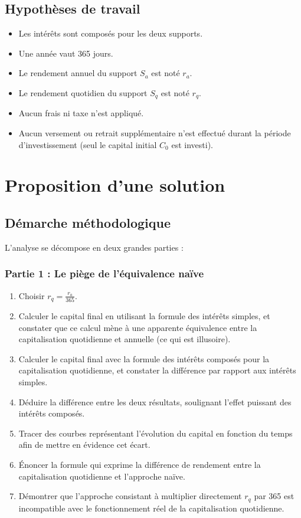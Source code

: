 \documentclass{article}
\begin{document}
\subsection{Hypothèses de travail}
\begin{itemize}
\item Les intérêts sont composés pour les deux supports.
\item Une année vaut 365 jours.
\item Le rendement annuel du support $S_a$ est noté $r_a$.
\item Le rendement quotidien du support $S_q$ est noté $r_q$.
\item Aucun frais ni taxe n'est appliqué.
\item Aucun versement ou retrait supplémentaire n’est effectué durant la période d'investissement (seul le capital initial $C_0$ est investi).
\end{itemize}

\section{Proposition d'une solution}
\subsection{Démarche méthodologique}
L'analyse se décompose en deux grandes parties :

\subsubsection*{Partie 1 : Le piège de l'équivalence naïve}
\begin{enumerate}
    \item Choisir \( r_q = \frac{r_a}{365} \).
    \item Calculer le capital final en utilisant la formule des intérêts simples, et constater que ce calcul mène à une apparente équivalence entre la capitalisation quotidienne et annuelle (ce qui est illusoire).
    \item Calculer le capital final avec la formule des intérêts composés pour la capitalisation quotidienne, et constater la différence par rapport aux intérêts simples.
    \item Déduire la différence entre les deux résultats, soulignant l'effet puissant des intérêts composés.
    \item Tracer des courbes représentant l'évolution du capital en fonction du temps afin de mettre en évidence cet écart.
    \item Énoncer la formule qui exprime la différence de rendement entre la capitalisation quotidienne et l'approche naïve.
    \item Démontrer que l'approche consistant à multiplier directement \( r_q \) par 365 est incompatible avec le fonctionnement réel de la capitalisation quotidienne. %
\end{enumerate}
\end{document}
